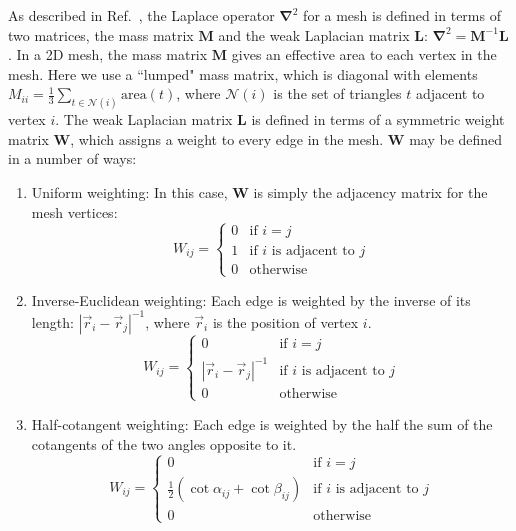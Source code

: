 \documentclass[final,3p,times,twocolumn]{elsarticle}
\newcounter{bla}
\begin{document}
As described in Ref.~\cite{Crane_Vouga_2014}, the Laplace operator $\mathbf{\nabla}^2$ for a mesh is defined in terms of two matrices, the mass matrix $\mathbf{M}$ and the
weak Laplacian matrix $\mathbf{L}$: $\mathbf{\nabla}^2 = \mathbf{M}^{-1}\mathbf{L}$. In a 2D mesh, the mass matrix $\mathbf{M}$ gives an effective area to each vertex in the mesh. Here we use a ``lumped" mass matrix, which is diagonal with elements $M_{ii} = \frac{1}{3}\sum_{t\in\mathcal{N}(i)}\mathrm{area}(t)$,
where $\mathcal{N}(i)$ is the set of triangles $t$ adjacent to vertex $i$. The weak Laplacian matrix $\mathbf{L}$ is defined in terms of a symmetric weight matrix $\mathbf{W}$, which assigns a weight to every edge in the mesh. $\mathbf{W}$ may be defined in a number of ways:

\begin{enumerate}
    \item{
        Uniform weighting: In this case, $\mathbf{W}$ is simply the adjacency matrix for the mesh vertices:
        $$
            W_{ij} =
            \begin{cases}
                0&\text{if }i=j\\
                1&\text{if }i\text{ is adjacent to }j\\
                0&\text{otherwise}
            \end{cases}
        $$
    }
    \item{
        Inverse-Euclidean weighting: Each edge is weighted by the inverse of its length: $|\vec{r}_i-\vec{r}_j|^{-1}$, where $\vec{r}_i$ is the position of vertex $i$.
        $$
            W_{ij} =
            \begin{cases}
                0&\text{if }i=j\\
                |\vec{r}_i-\vec{r}_j|^{-1}&\text{if }i\text{ is adjacent to }j\\
                0&\text{otherwise}
            \end{cases}
        $$
    }
    \item{
        Half-cotangent weighting: Each edge is weighted by the half the sum of the cotangents of the two angles opposite to it.
        $$
            W_{ij} =
            \begin{cases}
                0&\text{if }i=j\\
                \frac{1}{2}\left(\cot\alpha_{ij}+\cot\beta_{ij}\right)&\text{if }i\text{ is adjacent to }j\\
                0&\text{otherwise}
            \end{cases}
        $$
    }
\end{enumerate}
\end{document}
